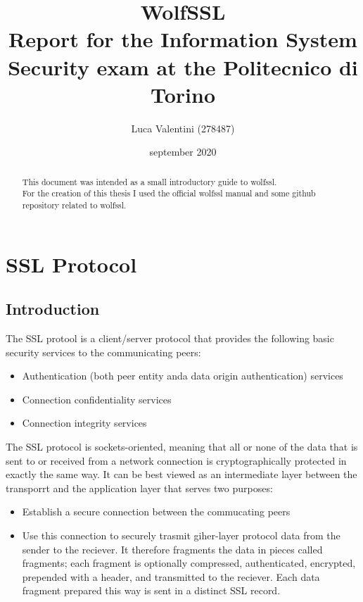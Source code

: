 \documentclass[a4paper,12pt]{article}
\begin{document}
\title{WolfSSL
\\
{\normalsize Report for the Information System Security exam at the Politecnico di Torino}
}
\author{Luca Valentini (278487)
\\
}
\date{september 2020}


\maketitle
\tableofcontents


\newpage
\begin{abstract}
This document was intended as a small introductory guide to wolfssl.
\\For the creation of this thesis I used the official wolfssl manual and some github repository related to wolfssl.
\end{abstract}
\newpage


\section{SSL Protocol}

\subsection{Introduction}
The SSL protool is a client/server protocol that provides the following basic security services to the communicating peers:
\begin{itemize}
	\item Authentication (both peer entity anda data origin authentication) services
	\item Connection confidentiality services
	\item Connection integrity services
\end{itemize}

The SSL protocol is sockets-oriented, meaning that all or none of the data that is sent to or received from a network connection is cryptographically protected in exactly the same way. It can be best viewed as an intermediate layer between the transporrt and the application layer that serves two purposes:
\begin{itemize}
	\item Establish a secure connection between the commucating peers
	\item Use this connection to securely trasmit giher-layer protocol data from the sender to the reciever. It therefore fragments the data in pieces called fragments; each fragment is optionally compressed, authenticated, encrypted, prepended with a header, and transmitted to the reciever. Each data fragment prepared this way is sent in a distinct SSL record.
\end{itemize}
\end{document}
